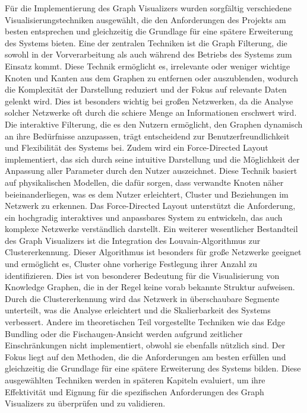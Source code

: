 Für die Implementierung des Graph Visualizers wurden sorgfältig verschiedene Visualisierungstechniken ausgewählt, die den Anforderungen des Projekts am besten entsprechen und gleichzeitig die Grundlage für eine spätere Erweiterung des Systems bieten. Eine der zentralen Techniken ist die Graph Filterung, die sowohl in der Vorverarbeitung als auch während des Betriebs des Systems zum Einsatz kommt. Diese Technik ermöglicht es, irrelevante oder weniger wichtige Knoten und Kanten aus dem Graphen zu entfernen oder auszublenden, wodurch die Komplexität der Darstellung reduziert und der Fokus auf relevante Daten gelenkt wird. Dies ist besonders wichtig bei großen Netzwerken, da die Analyse solcher Netzwerke oft durch die schiere Menge an Informationen erschwert wird. Die interaktive Filterung, die es den Nutzern ermöglicht, den Graphen dynamisch an ihre Bedürfnisse anzupassen, trägt entscheidend zur Benutzerfreundlichkeit und Flexibilität des Systems bei. Zudem wird ein Force-Directed Layout implementiert, das sich durch seine intuitive Darstellung und die Möglichkeit der Anpassung aller Parameter durch den Nutzer auszeichnet. Diese Technik basiert auf physikalischen Modellen, die dafür sorgen, dass verwandte Knoten näher beieinanderliegen, was es dem Nutzer erleichtert, Cluster und Beziehungen im Netzwerk zu erkennen. Das Force-Directed Layout unterstützt die Anforderung, ein hochgradig interaktives und anpassbares System zu entwickeln, das auch komplexe Netzwerke verständlich darstellt. Ein weiterer wesentlicher Bestandteil des Graph Visualizers ist die Integration des Louvain-Algorithmus zur Clustererkennung. Dieser Algorithmus ist besonders für große Netzwerke geeignet und ermöglicht es, Cluster ohne vorherige Festlegung ihrer Anzahl zu identifizieren. Dies ist von besonderer Bedeutung für die Visualisierung von Knowledge Graphen, die in der Regel keine vorab bekannte Struktur aufweisen. Durch die Clustererkennung wird das Netzwerk in überschaubare Segmente unterteilt, was die Analyse erleichtert und die Skalierbarkeit des Systems verbessert. Andere im theoretischen Teil vorgestellte Techniken wie das Edge Bundling oder die Fischaugen-Ansicht werden aufgrund zeitlicher Einschränkungen nicht implementiert, obwohl sie ebenfalls nützlich sind. Der Fokus liegt auf den Methoden, die die Anforderungen am besten erfüllen und gleichzeitig die Grundlage für eine spätere Erweiterung des Systems bilden. Diese ausgewählten Techniken werden in späteren Kapiteln evaluiert, um ihre Effektivität und Eignung für die spezifischen Anforderungen des Graph Visualizers zu überprüfen und zu validieren.

